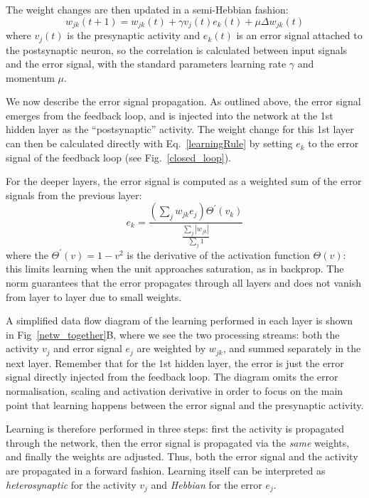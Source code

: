 \documentclass{article}
\begin{document}
The weight changes are then updated in a semi-Hebbian fashion:
\begin{equation}
  w_{jk}(t+1) = w_{jk}(t) + \gamma v_j(t)  e_k(t) + \mu \Delta w_{jk}(t) \label{learningRule}
\end{equation}
where $v_j(t)$ is the presynaptic activity and $e_k(t)$ is an error
signal attached to the postsynaptic neuron, so the correlation is
calculated between input signals and the error signal, with the
standard parameters learning rate $\gamma$ and momentum $\mu$.

We now describe the error signal propagation. As outlined above, the
error signal emerges from the feedback loop, and is injected into the
network at the 1st hidden layer as the ``postsynaptic'' activity. The
weight change for this 1st layer can then be calculated directly with
Eq.~\ref{learningRule} by setting $e_k$ to the error signal of the
feedback loop (see Fig.~\ref{closed_loop}).

For the deeper layers, the error signal is computed as a weighted
sum of the error signals from the previous layer:
\begin{equation}
  e_k = \frac{\left( \sum_j w_{jk} e_{j} \right) \Theta^\prime (v_k) }{\frac{\sum_j {|w_{jk}|}}{\sum_j 1}}
  \label{deepError}
\end{equation}
where the $\Theta^\prime (v) = 1 - v^2$ is the derivative of the
activation function $\Theta(v)$: this limits learning when the unit
approaches saturation, as in backprop. The norm guarantees that
the error propagates through all layers and does not vanish from
layer to layer due to small weights.

A simplified data flow diagram of the learning performed in each layer
is shown in Fig~\ref{netw_together}B, where we see the two processing
streams: both the activity $v_j$ and error signal $e_j$ are weighted
by $w_{jk}$, and summed separately in the next layer. Remember that
for the 1st hidden layer, the error is just the error signal
directly injected from the feedback loop. The diagram omits the error
normalisation, scaling and activation derivative in order to focus on
the main point that learning happens between the error signal and the
presynaptic activity.

Learning is therefore performed in three steps: first the activity is
propagated through the network, then the error signal is propagated
via the \textsl{same} weights, and finally the weights are adjusted. Thus,
both the error signal and the activity are propagated in a forward
fashion. Learning itself can be interpreted as \textsl{heterosynaptic} for the
activity $v_j$ and \textsl{Hebbian} for the error $e_j$.
\end{document}
